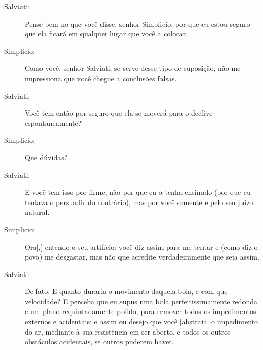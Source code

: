 \begin{description}
\item[Salviati:] Pense bem no que você disse, senhor Simplicio, por que eu estou seguro que ela ficará em qualquer lugar que você a colocar.

\item[Simplicio:] Como você, senhor Salviati, se serve desse tipo de suposição, não me impressiona que você chegue a conclusões falsas.

\item[Salviati:] Você tem então por seguro que ela se moverá para o declive espontaneamente?

\item[Simplicio:] Que dúvidas?

\item[Salviati:] E você tem isso por firme, não por que eu o tenha ensinado (por que eu tentava o persuadir do contrário), mas por você somente e pelo seu juízo natural.

\item[Simplicio:] Ora[,] entendo o seu artifício: você diz assim para me tentar e (como diz o povo) me desgastar, mas não que acredite verdadeiramente que seja assim. 

\item[Salviati:] De fato. E quanto duraria o movimento daquela bola, e com que velocidade? E perceba que eu supus uma bola perfeitissimamente redonda e um plano requintadamente polido, para remover todos os impedimentos externos e acidentais: e assim eu desejo que você [abstraia] o impedimento do ar, mediante à sua resistência em ser aberto, e todos os outros obstáculos acidentais, se outros puderem haver.


\end{description}
